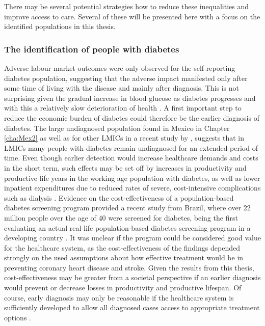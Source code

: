There may be several potential strategies how to reduce these inequalities and improve access to care. Several of these will be presented here with a focus on the identified populations in this thesis.

\subsubsection*{The identification of people with diabetes}

Adverse labour market outcomes were only observed for the self-reporting diabetes population, suggesting that the adverse impact manifested only after some time of living with the disease and mainly after diagnosis. This is not surprising given the gradual increase in blood glucose as diabetes progresses and with this a relatively slow deterioration of health \parencite{Bertram2010}. A first important step to reduce the economic burden of diabetes could therefore be the earlier diagnosis of diabetes. The large undiagnosed population found in Mexico in Chapter \ref{cha:Mex2} as well as for other \acp{LMIC} in a recent study by \textcite{Beagley2014}, suggests that in \acp{LMIC} many people with diabetes remain undiagnosed for an extended period of time. Even though earlier detection would increase healthcare demands and costs in the short term, such effects may be set off by increases in productivity and productive life years in the working age population with diabetes, as well as lower inpatient expenditures due to reduced rates of severe, cost-intensive complications such as dialysis  \parencite{Engelgau2012}. Evidence on the cost-effectiveness of a population-based diabetes screening program provided a recent study from Brazil, where over 22 million people over the age of 40 were screened for diabetes, being the first evaluating an actual real-life population-based diabetes screening program in a developing country \parencite{Toscano2015}. It was unclear if the program could be considered good value for the healthcare system, as the cost-effectiveness of the findings depended strongly on the used assumptions about how effective treatment would be in preventing coronary heart disease and stroke. Given the results from this thesis, cost-effectiveness may be greater from a societal perspective if an earlier diagnosis would prevent or decrease losses in productivity and productive lifespan. Of course, early diagnosis may only be reasonable if the healthcare system is sufficiently developed to allow all diagnosed cases access to appropriate treatment options \parencite{Toscano2015,Engelgau2012}. 

